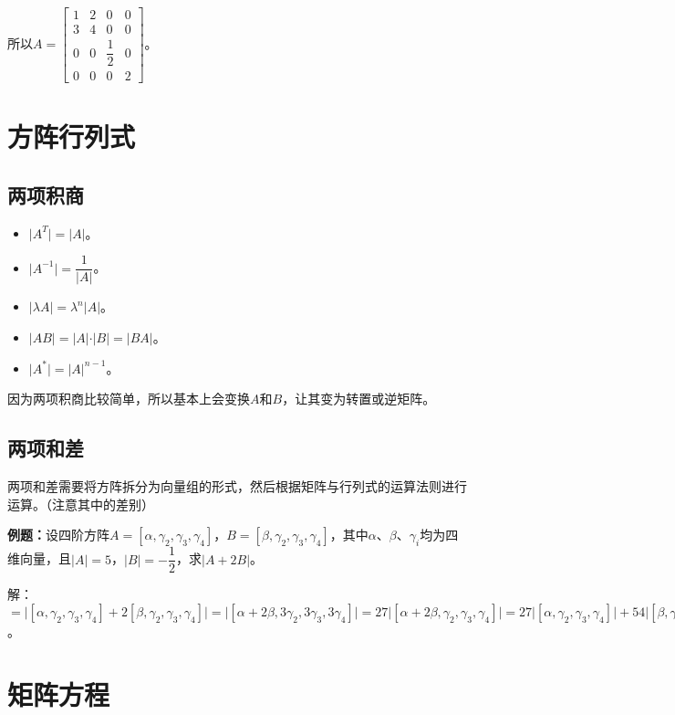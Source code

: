 \documentclass[UTF8, 12pt]{ctexart}
\begin{document}
所以$A=\left[\begin{array}{cccc}
    1 & 2 & 0 & 0 \\
    3 & 4 & 0 & 0 \\
    0 & 0 & \dfrac{1}{2} & 0 \\
    0 & 0 & 0 & 2
\end{array}\right]$。

\section{方阵行列式}

\subsection{两项积商}

\begin{itemize}
    \item $\vert A^T\vert=\vert A\vert$。
    \item $\vert A^{-1}\vert=\dfrac{1}{\vert A\vert}$。
    \item $\vert\lambda A\vert=\lambda^n\vert A\vert$。
    \item $\vert AB\vert=\vert A\vert\cdot\vert B\vert=\vert BA\vert$。
    \item $\vert A^*\vert=\vert A\vert^{n-1}$。
\end{itemize}

因为两项积商比较简单，所以基本上会变换$A$和$B$，让其变为转置或逆矩阵。

\subsection{两项和差}

两项和差需要将方阵拆分为向量组的形式，然后根据矩阵与行列式的运算法则进行运算。（注意其中的差别）

\textbf{例题：}设四阶方阵$A=[\alpha,\gamma_2,\gamma_3,\gamma_4]$，$B=[\beta,\gamma_2,\gamma_3,\gamma_4]$，其中$\alpha$、$\beta$、$\gamma_i$均为四维向量，且$\vert A\vert=5$，$\vert B\vert=-\dfrac{1}{2}$，求$\vert A+2B\vert$。

解：$=\vert[\alpha,\gamma_2,\gamma_3,\gamma_4]+2[\beta,\gamma_2,\gamma_3,\gamma_4]\vert=\vert[\alpha+2\beta,3\gamma_2,3\gamma_3,3\gamma_4]\vert=27\vert[\alpha+2\beta,\gamma_2,\gamma_3,\gamma_4]\vert=27\vert[\alpha,\gamma_2,\gamma_3,\gamma_4]\vert+54\vert[\beta,\gamma_2,\gamma_3,\gamma_4]\vert=27(\vert A\vert+2\vert B\vert)=108$。

\section{矩阵方程}
\end{document}
